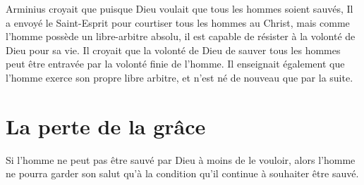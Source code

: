 \begin{pocketpar}{}
Arminius croyait que puisque Dieu voulait que tous les hommes soient sauvés,
 Il a envoyé le Saint-Esprit pour \Og courtiser \Fg{}
 tous les hommes au Christ,
 mais comme l'homme
 possède un \Og libre-arbitre \Fg{} absolu, il est capable de résister
 à la volonté de Dieu pour sa vie.
 Il croyait que la volonté de Dieu de sauver tous les hommes peut être
 entravée par la volonté finie de l'homme.
 Il enseignait également que l'homme exerce son propre libre arbitre,
 et n'est né de nouveau que par la suite.
\end{pocketpar}

\section*{La perte de la grâce}

Si l'homme ne peut pas être sauvé par Dieu à moins de le vouloir,
 alors l'homme ne pourra garder son salut qu'à la condition
 qu'il continue à souhaiter être sauvé.




